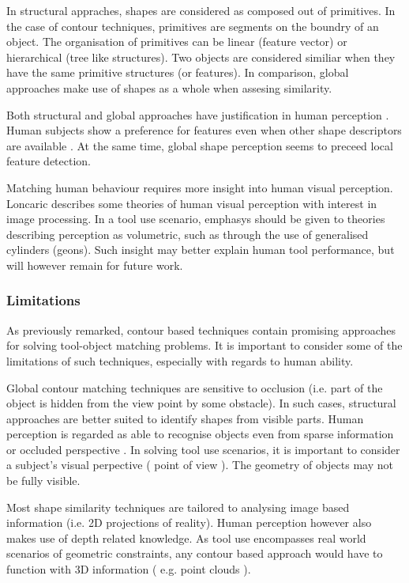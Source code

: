 \documentclass[11]{article}
\begin{document}
In structural appraches, shapes are considered as composed out of primitives. In the case of contour techniques, primitives are segments on the boundry of an object. The organisation of primitives can be linear (feature vector\cite{zhang2004}) or hierarchical (tree like structures\cite{zhu2015}). Two objects are considered similiar when they have the same primitive structures (or features). In comparison, global approaches make use of shapes as a whole when assesing similarity. 

Both structural and global approaches have justification in human perception \cite{zhang2004}. Human subjects show a preference for features even when other shape descriptors are available \cite{chatbri2016}. At the same time, global shape perception seems to preceed local feature detection\cite{navon1977}. 

Matching human behaviour requires more insight into human visual perception. Loncaric\cite{loncaric1998} describes some theories of human visual perception with interest in image processing. In a tool use scenario, emphasys should be given to theories describing perception as volumetric, such as through the use of generalised cylinders (geons\cite{dickinson2014}). Such insight may better explain human tool performance, but will however remain for future work.    

\subsubsection{Limitations}
As previously remarked, contour based techniques contain promising approaches for solving tool-object matching problems. It is important to consider some of the limitations of such techniques, especially with regards to human ability. 

Global contour matching techniques are sensitive to occlusion (i.e. part of the object is hidden from the view point by some obstacle). In such cases, structural approaches are better suited to identify shapes from visible parts. Human perception is regarded as able to recognise objects even from sparse information or occluded perspective \cite{loncaric1998}. In solving tool use scenarios, it is important to consider a subject's visual perpective ( point of view ). The geometry of objects may not be fully visible. 

Most shape similarity techniques are tailored to analysing image based information (i.e. 2D projections of reality). Human perception however also makes use of depth related knowledge. As tool use encompasses real world scenarios of geometric constraints, any contour based approach would have to function with 3D information ( e.g. point clouds ).  



\printbibliography
\end{document}
